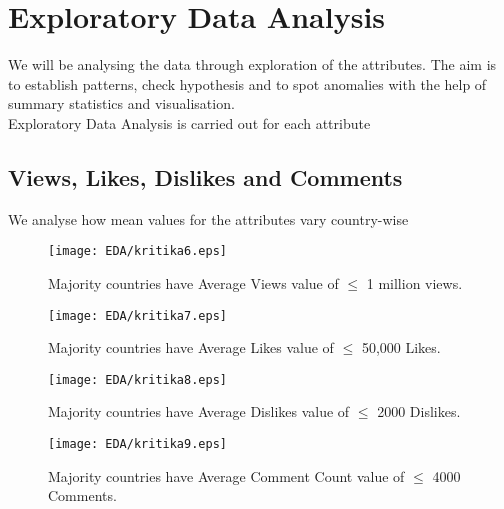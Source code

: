 \documentclass[runningheads]{llncs}
\begin{document}
\newpage
\section{Exploratory Data Analysis}
We will be analysing the data through exploration of the attributes. The aim is to establish patterns, check hypothesis and to spot anomalies with the help of summary statistics and visualisation.
\\Exploratory Data Analysis is carried out for each attribute
\subsection{Views, Likes, Dislikes and Comments}
We analyse how mean values for the attributes vary country-wise
\begin{figure}[H]
\centering
\begin{minipage}{.5\textwidth}
  \centering
  \texttt{[image: EDA/kritika6.eps]}
  \caption{Majority countries have Average Views value of $\leq$ 1 million views.}
\end{minipage}%
\begin{minipage}{.5\textwidth}
  \centering
  \texttt{[image: EDA/kritika7.eps]}
  \caption{Majority countries have Average Likes value of $\leq$ 50,000 Likes.}
\end{minipage}
\end{figure}
\begin{figure}[H]
\centering
\begin{minipage}{.5\textwidth}
  \centering
  \texttt{[image: EDA/kritika8.eps]}
  \caption{Majority countries have Average Dislikes value of $\leq$ 2000 Dislikes.} 
\end{minipage}%
\begin{minipage}{.5\textwidth}
  \centering
  \texttt{[image: EDA/kritika9.eps]}
  \caption{Majority countries have Average Comment Count value of $\leq$ 4000 Comments.} 
\end{minipage}
\end{figure}
\end{document}
